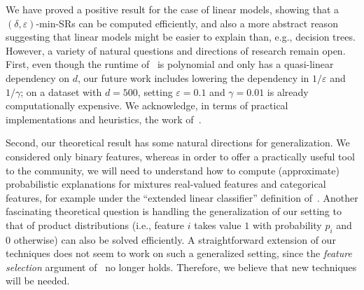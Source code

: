 We have proved a positive result for the case of linear models, showing that a $(\delta, \varepsilon)$-min-SRs can be computed efficiently, and also a more abstract reason suggesting that linear models might be easier to explain than, e.g., decision trees. However, a variety of natural questions and directions of research remain open. First, even though the runtime of~ is polynomial and only has a quasi-linear dependency on $d$, our future work includes lowering the dependency in $1/\varepsilon$ and $1/\gamma$; on a dataset with $d = 500$, setting $\varepsilon = 0.1$ and $\gamma = 0.01$ is already computationally expensive. We acknowledge, in terms of practical implementations and heuristics, the work of~\citet{Louenas,izza2024locallyminimalprobabilisticexplanations,izzaComputingProbabilisticAbductive2023}.

Second, our theoretical result has some natural directions for generalization. We considered only binary features, whereas in order to offer a practically useful tool to the community, we will need to understand how to compute (approximate) probabilistic explanations for mixtures real-valued features and categorical features, for example under the ``extended linear classifier'' definition of~\citet{DBLP:conf/nips/0001GCIN20}.  Another fascinating theoretical question is handling the generalization of our setting to that of product distributions (i.e., feature $i$ takes value $1$ with probability $p_i$ and $0$ otherwise) can also be solved efficiently. A straightforward extension of our techniques does not seem to work on such a generalized setting, since the \emph{feature selection} argument of~ no longer holds. Therefore, we believe that new techniques will be needed.  
 
